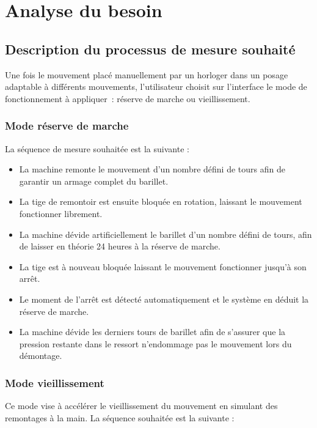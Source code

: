 \chapter{Analyse du besoin}

\section{Description du processus de mesure souhaité}

Une fois le mouvement placé manuellement par un horloger dans un posage adaptable à différents mouvements, l'utilisateur choisit sur l'interface le mode de fonctionnement à appliquer~: réserve de marche ou vieillissement.

\subsection{Mode réserve de marche}

La séquence de mesure souhaitée est la suivante :

\begin{itemize}
    \item La machine remonte le mouvement d'un nombre défini de tours afin de garantir un armage complet du barillet.
    \item La tige de remontoir est ensuite bloquée en rotation, laissant le mouvement fonctionner librement.
    \item La machine dévide artificiellement le barillet d'un nombre défini de tours, afin de laisser en théorie 24 heures à la réserve de marche.
    \item La tige est à nouveau bloquée laissant le mouvement fonctionner jusqu'à son arrêt.
    \item Le moment de l'arrêt est détecté automatiquement et le système en déduit la réserve de marche.
    \item La machine dévide les derniers tours de barillet afin de s'assurer que la pression restante dans le ressort n'endommage pas le mouvement lors du démontage.
\end{itemize}

\subsection{Mode vieillissement}

Ce mode vise à accélérer le vieillissement du mouvement en simulant des remontages à la main. La séquence souhaitée est la suivante :


